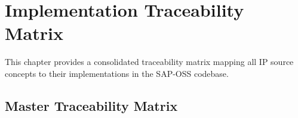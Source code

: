 
\chapter{Implementation Traceability Matrix}
\label{chap:traceability-matrix}

This chapter provides a consolidated traceability matrix mapping all IP source concepts to their implementations in the SAP-OSS codebase.

\section{Master Traceability Matrix}

